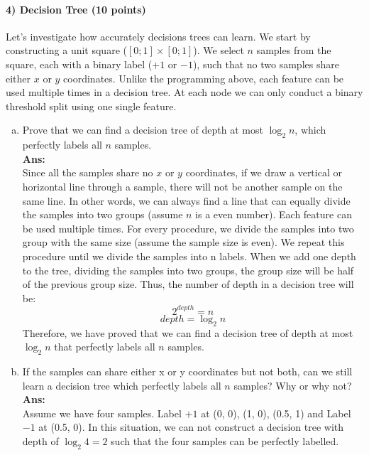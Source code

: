 \documentclass[11pt]{article}
\begin{document}
\paragraph{4) Decision Tree (10 points)} Let's investigate how accurately decisions trees can learn. We start by constructing a unit square ($[0; 1] \times [0;1]$). We select $n$ samples from the square, each with a binary label ($+1$ or $-1$), such that no two samples share either $x$ or $y$ coordinates.  Unlike the programming above, each feature can be used multiple times in a decision tree. At each node we can only conduct a binary threshold split using one single feature. 
\begin{enumerate}[(a)]
\item Prove that we can find a decision tree of depth at most $\log_2n$, which perfectly labels all $n$ samples. \\
\textbf{Ans:}\\
Since all the samples share no $x$ or $y$ coordinates, if we draw a vertical or horizontal line through a sample, there will not be another sample on the same line. In other words, we can always find a line that can equally divide the samples into two groups (assume $n$ is a even number). Each feature can be used multiple times. For every procedure, we divide the samples into two group with the same size (assume the sample size is even). We repeat this procedure until we divide the samples into n labels. When we add one depth to the tree, dividing the samples into two groups, the group size will be half of the previous group size. Thus, the number of depth in a decision tree will be:
$$2^{depth} = n$$
$$depth = \log_2 n$$
Therefore, we have proved that we can find a decision tree of depth at most $\log_2 n$ that perfectly labels all $n$ samples.

\item If the samples can share either x or y coordinates but not both, can we still learn a decision tree which perfectly labels all $n$ samples? Why or why not?\\
\textbf{Ans:}\\
Assume we have four samples. Label $+1$ at (0, 0), (1, 0), (0.5, 1) and Label $-1$ at (0.5, 0). In this situation, we can not construct a decision tree with depth of $\log_2 4=2$ such that the four samples can be perfectly labelled.


\end{enumerate}
\end{document}
